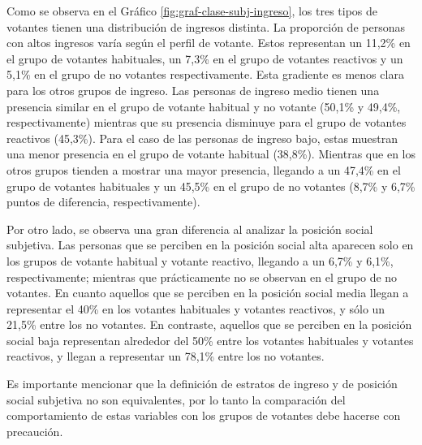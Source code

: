 \documentclass[
  12pt,
]{book}
\begin{document}
Como se observa en el Gráfico \ref{fig:graf-clase-subj-ingreso}, los tres tipos de votantes tienen una distribución de ingresos distinta. La proporción de personas con altos ingresos varía según el perfil de votante. Estos representan un 11,2\% en el grupo de votantes habituales, un 7,3\% en el grupo de votantes reactivos y un 5,1\% en el grupo de no votantes respectivamente. Esta gradiente es menos clara para los otros grupos de ingreso. Las personas de ingreso medio tienen una presencia similar en el grupo de votante habitual y no votante (50,1\% y 49,4\%, respectivamente) mientras que su presencia disminuye para el grupo de votantes reactivos (45,3\%). Para el caso de las personas de ingreso bajo, estas muestran una menor presencia en el grupo de votante habitual (38,8\%). Mientras que en los otros grupos tienden a mostrar una mayor presencia, llegando a un 47,4\% en el grupo de votantes habituales y un 45,5\% en el grupo de no votantes (8,7\% y 6,7\% puntos de diferencia, respectivamente).

Por otro lado, se observa una gran diferencia al analizar la posición social subjetiva. Las personas que se perciben en la posición social alta aparecen solo en los grupos de votante habitual y votante reactivo, llegando a un 6,7\% y 6,1\%, respectivamente; mientras que prácticamente no se observan en el grupo de no votantes. En cuanto aquellos que se perciben en la posición social media llegan a representar el 40\% en los votantes habituales y votantes reactivos, y sólo un 21,5\% entre los no votantes. En contraste, aquellos que se perciben en la posición social baja representan alrededor del 50\% entre los votantes habituales y votantes reactivos, y llegan a representar un 78,1\% entre los no votantes.

Es importante mencionar que la definición de estratos de ingreso y de posición social subjetiva no son equivalentes, por lo tanto la comparación del comportamiento de estas variables con los grupos de votantes debe hacerse con precaución.
\end{document}
